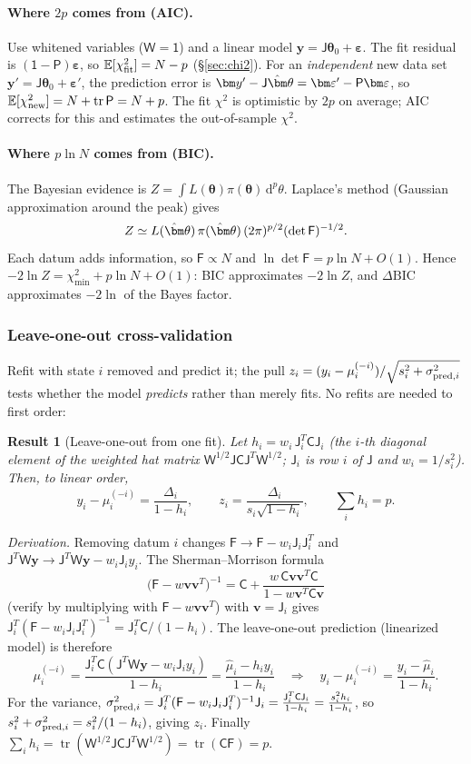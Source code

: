 \documentclass[11pt,a4paper]{article}
\numberwithin{equation}{section}
\theoremstyle{definition}
\theoremstyle{plain}
\newtheorem{result}[definition]{Result}
\theoremstyle{remark}
\numberwithin{algorithm}{section}
\newcommand{\dd}{\mathrm{d}}
\newcommand{\sJ}{\mathsf J}
\newcommand{\sW}{\mathsf W}
\newcommand{\sF}{\mathsf F}
\newcommand{\sC}{\mathsf C}
\newcommand{\sP}{\mathsf P}
\newcommand{\sI}{\mathsf 1}
\newcommand{\vth}{\bm\theta}
\begin{document}
\paragraph{Where $2p$ comes from (AIC).} Use whitened variables ($\sW=\sI$) and a linear model $\bm y=\sJ\vth_0+\bm\varepsilon$. The fit residual is $(\sI-\sP)\bm\varepsilon$, so $\mathbb E[\chi^2_{\rm fit}]=N-p$ (\S\ref{sec:chi2}). For an \emph{independent} new data set $\bm y'=\sJ\vth_0+\bm\varepsilon'$, the prediction error is $\bm y'-\sJ\hat\vth=\bm\varepsilon'-\sP\bm\varepsilon$, so $\mathbb E[\chi^2_{\rm new}]=N+\operatorname{tr}\sP=N+p$. The fit $\chi^2$ is optimistic by $2p$ on average; AIC corrects for this and estimates the out-of-sample $\chi^2$.

\paragraph{Where $p\ln N$ comes from (BIC).} The Bayesian evidence is $Z=\int L(\vth)\pi(\vth)\,\dd^p\theta$. Laplace's method (Gaussian approximation around the peak) gives
\[
Z\simeq L(\hat\vth)\,\pi(\hat\vth)\,(2\pi)^{p/2}(\det\sF)^{-1/2}.
\]
Each datum adds information, so $\sF\propto N$ and $\ln\det\sF=p\ln N+O(1)$. Hence $-2\ln Z=\chi^2_{\min}+p\ln N+O(1)$: BIC approximates $-2\ln Z$, and $\Delta\mathrm{BIC}$ approximates $-2\ln$ of the Bayes factor.

\subsubsection{Leave-one-out cross-validation}
Refit with state $i$ removed and predict it; the pull
$z_i=(y_i-\mu_i^{(-i)})/\sqrt{s_i^2+\sigma_{{\rm pred},i}^2}$ tests whether the model \emph{predicts} rather than merely fits. No refits are needed to first order:

\begin{result}[Leave-one-out from one fit]
Let $h_i=w_i\,\sJ_i^T\sC\sJ_i$ (the $i$-th diagonal element of the weighted hat matrix $\sW^{1/2}\sJ\sC\sJ^T\sW^{1/2}$; $\sJ_i$ is row $i$ of $\sJ$ and $w_i=1/s_i^2$). Then, to linear order,
\begin{equation}
y_i-\mu_i^{(-i)}=\frac{\Delta_i}{1-h_i},\qquad
z_i=\frac{\Delta_i}{s_i\sqrt{1-h_i}},\qquad \sum_ih_i=p .
\label{eq:loo}
\end{equation}
\end{result}
\emph{Derivation.} Removing datum $i$ changes $\sF\to\sF-w_i\sJ_i\sJ_i^T$ and $\sJ^T\sW\bm y\to\sJ^T\sW\bm y-w_i\sJ_iy_i$. The Sherman--Morrison formula
\[
\big(\sF-w\bm v\bm v^T\big)^{-1}=\sC+\frac{w\,\sC\bm v\bm v^T\sC}{1-w\bm v^T\sC\bm v}
\]
(verify by multiplying with $\sF-w\bm v\bm v^T$) with $\bm v=\sJ_i$ gives $\sJ_i^T(\sF-w_i\sJ_i\sJ_i^T)^{-1}=\sJ_i^T\sC/(1-h_i)$. The leave-one-out prediction (linearized model) is therefore
\[
\mu_i^{(-i)}=\frac{\sJ_i^T\sC(\sJ^T\sW\bm y-w_i\sJ_iy_i)}{1-h_i}=\frac{\hat\mu_i-h_iy_i}{1-h_i}
\quad\Rightarrow\quad y_i-\mu_i^{(-i)}=\frac{y_i-\hat\mu_i}{1-h_i}.
\]
For the variance, $\sigma^2_{{\rm pred},i}=\sJ_i^T(\sF-w_i\sJ_i\sJ_i^T)^{-1}\sJ_i=\frac{\sJ_i^T\sC\sJ_i}{1-h_i}=\frac{s_i^2h_i}{1-h_i}$, so $s_i^2+\sigma_{{\rm pred},i}^2=s_i^2/(1-h_i)$, giving $z_i$. Finally $\sum_ih_i=\operatorname{tr}(\sW^{1/2}\sJ\sC\sJ^T\sW^{1/2})=\operatorname{tr}(\sC\sF)=p$.
\end{document}
